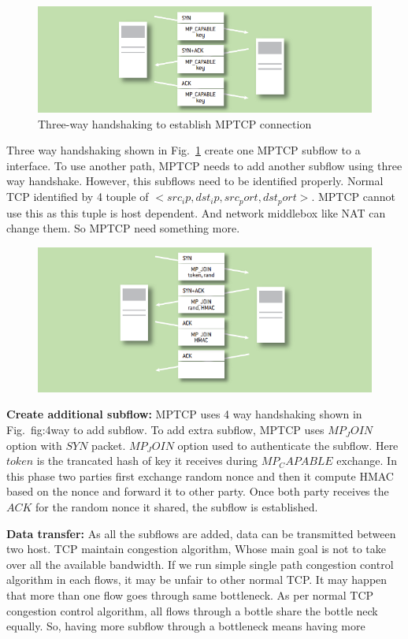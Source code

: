 \begin{figure}
\centering
\includegraphics[width=\linewidth]{img/mptcp/paasch2}
\caption{Three-way handshaking to establish MPTCP connection}
\label{fig:ConnectionEstablishment}
\end{figure}
Three way handshaking shown in Fig.~\ref{fig:ConnectionEstablishment} create one MPTCP subflow to a interface. To use another path, MPTCP needs to add another subflow using three way handshake. However, this subflows need to be identified properly. Normal TCP identified by 4 touple of $<src_ip,dst_ip,src_port,dst_port>$. MPTCP cannot use this as this tuple is host dependent. And network middlebox like NAT can change them. So MPTCP need something more. 

\begin{figure}
    \centering
    \includegraphics[width=\linewidth]{img/mptcp/paasch3}
    \caption{}
    \label{fig:4way}
\end{figure}
\textbf{Create additional subflow:} MPTCP uses 4 way handshaking shown in Fig.~\figurename{fig:4way} to add subflow. To add extra subflow, MPTCP uses $MP_JOIN$ option with $SYN$ packet. $MP_JOIN$ option used to authenticate the subflow. Here $token$ is the trancated hash of key it receives during $MP_CAPABLE$ exchange. In this phase two parties first exchange random nonce and then it compute HMAC based on the nonce and forward it to other party. Once both party receives the $ACK$ for the random nonce it shared, the subflow is established.

\textbf{Data transfer:}
As all the subflows are added, data can be transmitted between two host. TCP maintain congestion algorithm, Whose main goal is not to take over all the available bandwidth. If we run simple single path congestion control algorithm in each flows, it may be unfair to other normal TCP. It may happen that more than one flow goes through same bottleneck. As per normal TCP congestion control algorithm, all flows through a bottle share the bottle neck equally. So, having more subflow through a bottleneck means having more 




